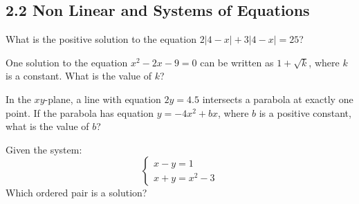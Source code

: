 \subsection*{2.2 Non Linear and Systems of Equations    }

\vspace{0.5em}

\setcounter{questionnum}{0}


\noindent\markforreview
\vspace{1em}

What is the positive solution to the equation  
\(2|4 - x| + 3|4 - x| = 25\)?

\vspace{0.75em}



\vspace{5em}

\noindent\markforreview
\vspace{1em}

One solution to the equation \(x^2 - 2x - 9 = 0\)  
can be written as \(1 + \sqrt{k}\), where \(k\) is a constant.  
What is the value of \(k\)?

\vspace{0.75em}



\newpage
\noindent\markforreview
\vspace{1em}

In the \(xy\)-plane, a line with equation \(2y = 4.5\) intersects a parabola at exactly one point.  
If the parabola has equation \(y = -4x^2 + bx\), where \(b\) is a positive constant,  
what is the value of \(b\)?

\vspace{0.75em}



\vspace{5em}

\noindent\markforreview
\vspace{1em}

Given the system:
\[
\begin{cases}
x - y = 1 \\
x + y = x^2 - 3
\end{cases}
\]
Which ordered pair is a solution?

\vspace{0.75em}





